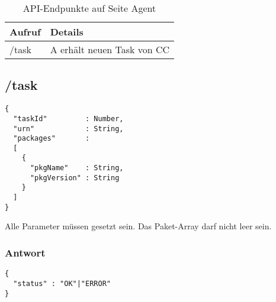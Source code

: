 \begin{table}[H]
    \centering
    \caption{API-Endpunkte auf Seite Agent}
    \label{api:endpoints_a}
    \begin{tabular}{ll}
        \hline
        \textbf{Aufruf}  & \textbf{Details}            \\ \hline
        /task            & A erhält neuen Task von CC  \\ \hline
    \end{tabular}
\end{table}

\subsection*{/task}

\begin{verbatim}
{
  "taskId"         : Number,
  "urn"            : String,
  "packages"       : 
  [
    {
      "pkgName"    : String,
      "pkgVersion" : String
    }
  ]
}
\end{verbatim}

Alle Parameter müssen gesetzt sein. Das Paket-Array darf nicht leer sein.


\subsubsection*{Antwort}

\begin{verbatim}
{
  "status" : "OK"|"ERROR" 
}
\end{verbatim}

